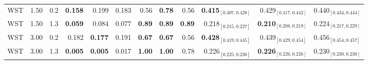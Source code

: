 \begin{table}[!h]
\begin{tabular}[t]{lrrrrrrrrrrr}
WST & 1.50 & 0.2 & \textbf{0.158} & 0.199 & 0.183 & 0.56 & \textbf{0.78} & 0.56 & \textbf{0.415$_{[0.407,0.428]}$} & 0.429$_{[0.417,0.442]}$ & 0.440$_{[0.434,0.444]}$\\
WST & 1.50 & 1.3 & \textbf{0.059} & 0.084 & 0.077 & \textbf{0.89} & \textbf{0.89} & \textbf{0.89} & 0.218$_{[0.215,0.227]}$ & \textbf{0.210$_{[0.208,0.219]}$} & 0.224$_{[0.217,0.229]}$\\
WST & 3.00 & 0.2 & 0.182 & \textbf{0.177} & 0.191 & \textbf{0.67} & \textbf{0.67} & 0.56 & \textbf{0.428$_{[0.419,0.445]}$} & 0.439$_{[0.429,0.454]}$ & 0.456$_{[0.454,0.457]}$\\
WST & 3.00 & 1.3 & \textbf{0.005} & \textbf{0.005} & 0.017 & \textbf{1.00} & \textbf{1.00} & 0.78 & 0.226$_{[0.225,0.230]}$ & \textbf{0.226$_{[0.226,0.226]}$} & 0.230$_{[0.230,0.230]}$\\
\bottomrule
\end{tabular}
\end{table}
